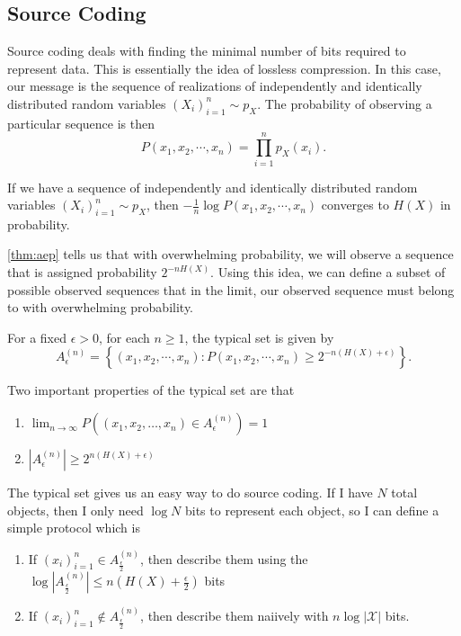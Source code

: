 \subsection{Source Coding}
Source coding deals with finding the minimal number of bits required to represent data.
This is essentially the idea of lossless compression.
In this case, our message is the sequence of realizations of independently and identically distributed random variables $\left(X_i\right)_{i=1}^n \sim p_X$.
The probability of observing a particular sequence is then \[
	P(x_1, x_2, \cdots, x_n) = \prod_{i=1}^np_X(x_i).
\]
\begin{theorem}
	If we have a sequence of independently and identically distributed random variables $\left(X_i\right)_{i=1}^n \sim p_X$, then $-\frac{1}{n}\log P(x_1, x_2, \cdots, x_n)$ converges to $H(X)$ in probability.
	\label{thm:aep}
\end{theorem}
\cref{thm:aep} tells us that with overwhelming probability, we will observe a sequence that is assigned probability $2^{-nH(X)}$.
Using this idea, we can define a subset of possible observed sequences that in the limit, our observed sequence must belong to with overwhelming probability.
\begin{definition}
	For a fixed $\epsilon > 0$, for each $n\geq 1$, the typical set is given by \[
		A_\epsilon^{(n)} = \left\{ (x_1, x_2, \cdots, x_n) : P(x_1, x_2, \cdots, x_n) \geq 2^{-n(H(X)+\epsilon)} \right\}.
	\]
	\label{defn:typical-set}
\end{definition}
Two important properties of the typical set are that
\begin{enumerate}
	\item $\lim_{n\to\infty}P\left((x_1, x_2, \ldots, x_n) \in A_{\epsilon}^{(n)}\right) = 1$
	\item $|A_{\epsilon}^{(n)}| \geq 2^{n(H(X)+\epsilon)}$
\end{enumerate}
The typical set gives us an easy way to do source coding.
If I have $N$ total objects, then I only need $\log N$ bits to represent each object, so I can define a simple protocol which is
\begin{enumerate}
	\item If $(x_i)_{i=1}^{n} \in A^{(n)}_{\frac{\epsilon}{2}}$, then describe them using the $\log|A^{(n)}_{\frac{\epsilon}{2}}| \leq n\left(H(X)+\frac{\epsilon}{2}\right)$ bits
	\item If $(x_i)_{i=1}^n \not \in A^{(n)}_{\frac{\epsilon}{2}}$, then describe them naiively with $n\log|\mathcal{X}|$ bits.
\end{enumerate}
